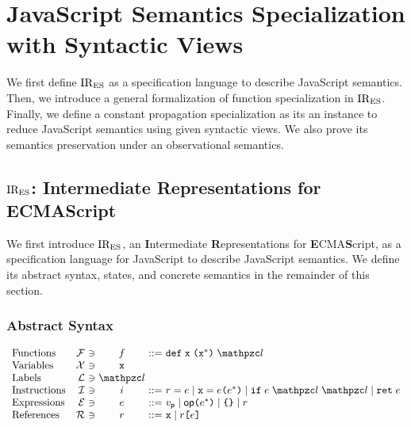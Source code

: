 \section{JavaScript Semantics Specialization with Syntactic Views}\label{sec:formal}

We first define $\text{IR}_\text{ES}$ as a specification language to describe JavaScript
semantics.  Then, we introduce a general formalization of function
specialization in $\text{IR}_\text{ES}$. Finally, we define a constant propagation
specialization as its an instance to reduce JavaScript semantics using given
syntactic views. We also prove its semantics preservation under an observational
semantics.

\subsection{$\text{IR}_\text{ES}$: Intermediate Representations for ECMAScript}

We first introduce $\text{IR}_\text{ES}$, an \textbf{I}ntermediate \textbf{R}epresentations
for \textbf{E}CMA\textbf{S}cript, as a specification language for JavaScript to
describe JavaScript semantics. We define its abstract syntax, states, and
concrete semantics in the remainder of this section.

\subsubsection{Abstract Syntax}

\[
  \begin{array}{lr@{~}c@{~}c@{~}c@{~}l}
    \text{Functions} & \funcset &\ni& \func &::=&
    \kwdef \; \varx \; \kwrl \varx^* \kwrr \; \lab\\

    \text{Variables} & \varset &\ni& \varx\\

    \text{Labels} & \labset &\ni& \lab\\

    \text{Instructions} & \instset &\ni& \inst &::=&
    \refer = \expr \mid
    \varx = \expr \kwrl \expr^* \kwrr \mid
    \kwif \; \expr \; \lab \; \lab \mid
    \kwret \; \expr\\

    \text{Expressions} & \exprset &\ni& \expr &::=&
    \pval \mid
    \op \kwrl \expr^* \kwrr \mid
    \kwcl \kwcr \mid
    \refer\\

    \text{References} & \referset &\ni& \refer &::=&
    \varx \mid \refer \kwsl \expr \kwsr\\
  \end{array}
\]

